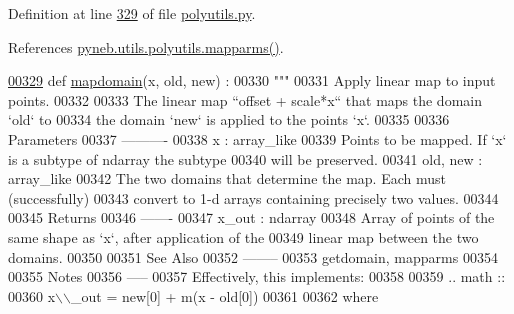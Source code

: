 Definition at line \hyperlink{polyutils_8py_source_l00329}{329} of file \hyperlink{polyutils_8py_source}{polyutils.\+py}.



References \hyperlink{polyutils_8py_source_l00282}{pyneb.\+utils.\+polyutils.\+mapparms()}.


\begin{DoxyCode}
\hypertarget{namespacepyneb_1_1utils_1_1polyutils_l00329}{}\hyperlink{namespacepyneb_1_1utils_1_1polyutils_a9a4c51bf58904c4c9ddc7d7525404481}{00329} \textcolor{keyword}{def }\hyperlink{namespacepyneb_1_1utils_1_1polyutils_a9a4c51bf58904c4c9ddc7d7525404481}{mapdomain}(x, old, new) :
00330     \textcolor{stringliteral}{"""}
00331 \textcolor{stringliteral}{    Apply linear map to input points.}
00332 \textcolor{stringliteral}{}
00333 \textcolor{stringliteral}{    The linear map ``offset + scale*x`` that maps the domain `old` to}
00334 \textcolor{stringliteral}{    the domain `new` is applied to the points `x`.}
00335 \textcolor{stringliteral}{}
00336 \textcolor{stringliteral}{    Parameters}
00337 \textcolor{stringliteral}{    ----------}
00338 \textcolor{stringliteral}{    x : array\_like}
00339 \textcolor{stringliteral}{        Points to be mapped. If `x` is a subtype of ndarray the subtype}
00340 \textcolor{stringliteral}{        will be preserved.}
00341 \textcolor{stringliteral}{    old, new : array\_like}
00342 \textcolor{stringliteral}{        The two domains that determine the map.  Each must (successfully)}
00343 \textcolor{stringliteral}{        convert to 1-d arrays containing precisely two values.}
00344 \textcolor{stringliteral}{}
00345 \textcolor{stringliteral}{    Returns}
00346 \textcolor{stringliteral}{    -------}
00347 \textcolor{stringliteral}{    x\_out : ndarray}
00348 \textcolor{stringliteral}{        Array of points of the same shape as `x`, after application of the}
00349 \textcolor{stringliteral}{        linear map between the two domains.}
00350 \textcolor{stringliteral}{}
00351 \textcolor{stringliteral}{    See Also}
00352 \textcolor{stringliteral}{    --------}
00353 \textcolor{stringliteral}{    getdomain, mapparms}
00354 \textcolor{stringliteral}{}
00355 \textcolor{stringliteral}{    Notes}
00356 \textcolor{stringliteral}{    -----}
00357 \textcolor{stringliteral}{    Effectively, this implements:}
00358 \textcolor{stringliteral}{}
00359 \textcolor{stringliteral}{    .. math ::}
00360 \textcolor{stringliteral}{        x\(\backslash\)\(\backslash\)\_out = new[0] + m(x - old[0])}
00361 \textcolor{stringliteral}{}
00362 \textcolor{stringliteral}{    where}

\end{DoxyCode}
